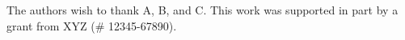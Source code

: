The authors wish to thank A, B, and C.
This work was supported in part by a grant from XYZ (\# 12345-67890).%
